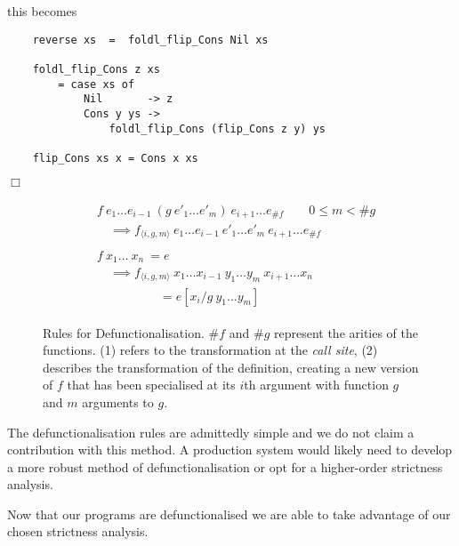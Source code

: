 this becomes

\begin{verbatim}
    reverse xs  =  foldl_flip_Cons Nil xs

    foldl_flip_Cons z xs 
        = case xs of
            Nil       -> z
            Cons y ys ->
                foldl_flip_Cons (flip_Cons z y) ys

    flip_Cons xs x = Cons x xs
\end{verbatim}

\hfill$\Box$

\begin{figure}[t]
 \begin{align}
  \begin{split}
   &f \ e_{1} \dots e_{i-1}\ (g \ e'_{1} \dots e'_{m})\ e_{i+1} \dots e_{\#f} \qquad 0 \leq m < \#g\\
   &\quad \implies f_{\langle i,g,m\rangle} \ e_{1} \dots e_{i-1}\ e'_{1} \dots e'_{m} \ e_{i+1} \dots e_{\#f}
  \end{split}\\[10pt]
  \begin{split}
  &f \ x_{1} \dots \ x_{n} \ = e \\
  &\quad \implies f_{\langle i,g,m\rangle} \ x_{1} \dots x_{i-1}\ y_{1} \dots y_{m}\ x_{i+1} \dots x_{n} \\
  & \qquad \qquad \quad = e[x_{i}/g\ y_{1} \dots y_{m}]
  \end{split}
 \end{align}
\caption[Defunctionalisation Rules]{%
        Rules for Defunctionalisation. $\#f$ and $\#g$ represent the arities of the functions.
        (1) refers to the transformation at the \emph{call site},
        (2) describes the transformation of the definition, creating a new version of $f$ that has
        been specialised at its $i$th argument with function $g$ and $m$ arguments to $g$.}
\label{defunRules}
\end{figure}

The defunctionalisation rules are admittedly simple and we do not claim a
contribution with this method. A production system would likely need to develop
a more robust method of defunctionalisation or opt for a higher-order
strictness analysis.

Now that our programs are defunctionalised we are able to take advantage of our
chosen strictness analysis.
